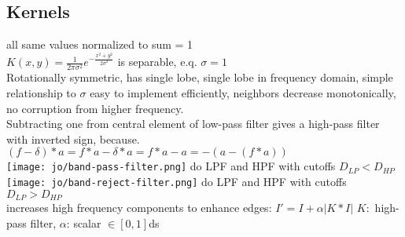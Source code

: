 \subsection*{Kernels}
 all same values normalized to sum = 1\\
 $K(x, y) = \frac{1}{2\pi \sigma^{2}} e^{-\frac{x^{2} + y^{2}}{2\sigma^{2}}}$ is separable, e.q. $\sigma = 1$\\
Rotationally symmetric, has single lobe, single lobe in frequency domain, simple relationship to $\sigma$ easy to implement efficiently, neighbors decrease monotonically, no corruption from higher frequency. \\
Subtracting one from central element of low-pass filter gives a high-pass filter with inverted sign, because.\\
$(f - \delta) * a = f * a - \delta * a = f * a - a = - (a - (f * a))$\\
 \texttt{[image: jo/band-pass-filter.png]}
do LPF and HPF with cutoffs $D_{LP} < D_{HP}$\\
 \texttt{[image: jo/band-reject-filter.png]}
do LPF and HPF with cutoffs $D_{LP} > D_{HP}$\\
 increases high frequency components to enhance edges: $I' = I + \alpha |K * I|$ $K:$ high-pass filter, $\alpha$: scalar $\in [0, 1]$ds